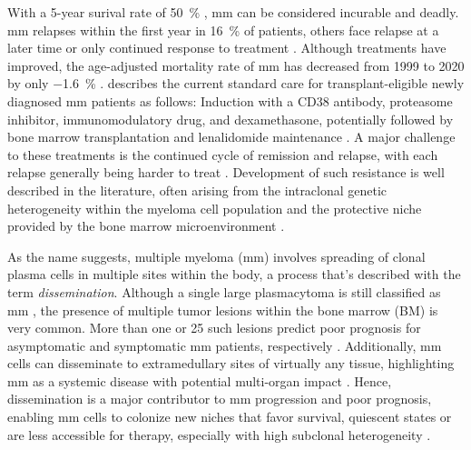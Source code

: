 With a 5-year surival rate of \SI{50}{\percent}
\cite{turessonRapidlyChangingMyeloma2018}, \ac{mm} can be considered incurable and
deadly. \ac{mm} relapses within the first year in \SI{16}{\percent} of patients,
others face relapse at a later time or only continued response to treatment
\cite{majithiaEarlyRelapseFollowing2016}. Although treatments have improved, the
age-adjusted mortality rate of \ac{mm} has decreased from 1999 to 2020 by only
\SI{-1.6}{\percent} \cite{doddiDisparitiesMultipleMyeloma2024}.
\citet{engelhardtFunctionalCureLongterm2024} describes the current standard care
for transplant-eligible newly diagnosed \ac{mm} patients as follows: Induction with a
CD38 antibody, proteasome inhibitor, immunomodulatory drug, and dexamethasone,
potentially followed by bone marrow transplantation and lenalidomide maintenance
\cite{rajkumarMultipleMyelomaCurrent2020}. A major challenge to these treatments
is the continued cycle of remission and relapse, with each relapse generally
being harder to treat \cite{podarRelapsedRefractoryMultiple2021}. Development of
such resistance is well described in the literature, often arising from the
intraclonal genetic heterogeneity within the myeloma cell population and the
protective niche provided by the bone marrow microenvironment
\cite{solimandoDrugResistanceMultiple2022}.



%
\label{sec:intro_myeloma_dissemination}%
As the name suggests, multiple myeloma (\ac{mm}) involves spreading of clonal plasma
cells in multiple sites within the body, a process that's described with the
term \emph{dissemination}. Although a single large plasmacytoma is still
classified as \ac{mm} \cite{rajkumarInternationalMyelomaWorking2014}, the presence of
multiple tumor lesions within the bone marrow (BM) is very common. More than one
or 25 such lesions predict poor prognosis for asymptomatic and symptomatic \ac{mm}
patients, respectively \cite{kastritisPrognosticImportancePresence2014,
    maiMagneticResonanceImagingbased2015a}. Additionally, \ac{mm} cells can disseminate
to extramedullary sites of virtually any tissue, highlighting \ac{mm} as a systemic
disease with potential multi-organ impact
\cite{rajkumarMultipleMyelomaCurrent2020,
    bladeExtramedullaryDiseaseMultiple2022}. Hence, dissemination is a major
contributor to \ac{mm} progression and poor prognosis, enabling \ac{mm} cells to colonize
new niches that favor survival, quiescent states or are less accessible for
therapy, especially with high subclonal heterogeneity
\cite{forsterMolecularImpactTumor2022,keatsClonalCompetitionAlternating2012}.

